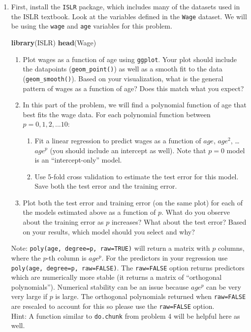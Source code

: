 \documentclass[]{article}
\newenvironment{Shaded}{\begin{snugshade}}{\end{snugshade}}
\newcommand{\KeywordTok}[1]{\textcolor[rgb]{0.13,0.29,0.53}{\textbf{#1}}}
\newcommand{\NormalTok}[1]{#1}
\providecommand{\tightlist}{%
  \setlength{\itemsep}{0pt}\setlength{\parskip}{0pt}}
\begin{document}
\begin{enumerate}
\def\labelenumi{\arabic{enumi}.}
\setcounter{enumi}{5}
\item
  First, install the \texttt{ISLR} package, which includes many of the
  datasets used in the ISLR textbook. Look at the variables defined in
  the \texttt{Wage} dataset. We will be using the \texttt{wage} and
  \texttt{age} variables for this problem.

\begin{Shaded}
\begin{Highlighting}[]
\KeywordTok{library}\NormalTok{(ISLR)}
\KeywordTok{head}\NormalTok{(Wage)}
\end{Highlighting}
\end{Shaded}

  \begin{enumerate}
  \item
    Plot wages as a function of age using \texttt{ggplot}. Your plot
    should include the datapoints (\texttt{geom\_point()}) as well as a
    smooth fit to the data (\texttt{geom\_smooth()}). Based on your
    visualization, what is the general pattern of wages as a function of
    age? Does this match what you expect?
  \item
    In this part of the problem, we will find a polynomial function of
    age that best fits the wage data. For each polynomial function
    between \(p=0, 1, 2, ... 10\):

    \begin{enumerate}
    \tightlist
    \item
      Fit a linear regression to predict wages as a function of \(age\),
      \(age^2\), \ldots{} \(age^p\) (you should include an intercept as
      well). Note that \(p=0\) model is an ``intercept-only'' model.
    \item
      Use 5-fold cross validation to estimate the test error for this
      model. Save both the test error and the training error.
    \end{enumerate}
  \item
    Plot both the test error and training error (on the same plot) for
    each of the models estimated above as a function of \(p\). What do
    you observe about the training error as \(p\) increases? What about
    the test error? Based on your results, which model should you select
    and why?
  \end{enumerate}

  Note: \texttt{poly(age,\ degree=p,\ raw=TRUE)} will return a matrix
  with \(p\) columns, where the \(p\)-th column is \(age^p\). For the
  predictors in your regression use
  \texttt{poly(age,\ degree=p,\ raw=FALSE)}. The \texttt{raw=FALSE}
  option returns predictors which are numerically more stable (it
  returns a matrix of ``orthogonal polynomials''). Numerical stability
  can be an issue because \(age^p\) can be very very large if \(p\) is
  large. The orthogonal polynomials returned when \texttt{raw=FALSE} are
  rescaled to account for this so please use the \texttt{raw=FALSE}
  option.\\
  Hint: A function similar to \texttt{do.chunk} from problem 4 will be
  helpful here as well.
\end{enumerate}
\end{document}
